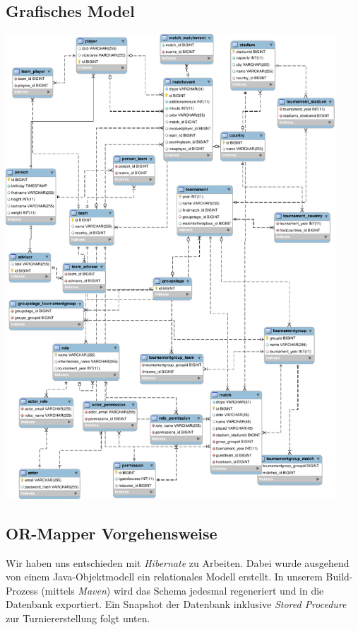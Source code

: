\documentclass[11pt,german]{scrartcl}
\begin{document}
\subsection*{Grafisches Model}
\begin{center}
\leavevmode
\includegraphics[width=0.93\textwidth]{../diagrams/relationales_schema.pdf}
\end{center}

\subsection*{OR-Mapper Vorgehensweise}
Wir haben uns entschieden mit \emph{Hibernate} zu Arbeiten. Dabei wurde ausgehend von einem Java-Objektmodell ein relationales Modell erstellt. In unserem Build-Prozess (mittels \emph{Maven}) wird das Schema jedesmal regeneriert und in die Datenbank exportiert. Ein Snapshot der Datenbank inklusive \emph{Stored Procedure} zur Turniererstellung folgt unten.
\end{document}
